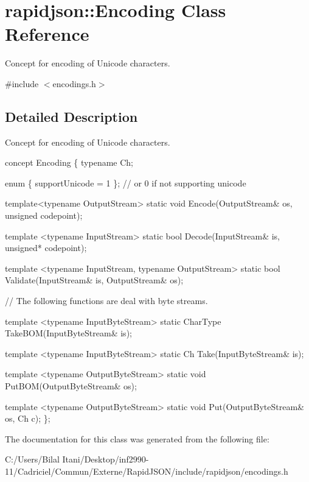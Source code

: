 \hypertarget{classrapidjson_1_1_encoding}{}\section{rapidjson\+:\+:Encoding Class Reference}
\label{classrapidjson_1_1_encoding}


Concept for encoding of Unicode characters.  




{\ttfamily \#include $<$encodings.\+h$>$}



\subsection{Detailed Description}
Concept for encoding of Unicode characters. 


\begin{DoxyCode}
concept Encoding \{
    \textcolor{keyword}{typename} Ch;    

    \textcolor{keyword}{enum} \{ supportUnicode = 1 \}; \textcolor{comment}{// or 0 if not supporting unicode}

    \textcolor{keyword}{template}<\textcolor{keyword}{typename} OutputStream>
    \textcolor{keyword}{static} \textcolor{keywordtype}{void} Encode(OutputStream& os, \textcolor{keywordtype}{unsigned} codepoint);

    \textcolor{keyword}{template} <\textcolor{keyword}{typename} InputStream>
    \textcolor{keyword}{static} \textcolor{keywordtype}{bool} Decode(InputStream& is, \textcolor{keywordtype}{unsigned}* codepoint);

    \textcolor{keyword}{template} <\textcolor{keyword}{typename} InputStream, \textcolor{keyword}{typename} OutputStream>
    \textcolor{keyword}{static} \textcolor{keywordtype}{bool} Validate(InputStream& is, OutputStream& os);

    \textcolor{comment}{// The following functions are deal with byte streams.}

    \textcolor{keyword}{template} <\textcolor{keyword}{typename} InputByteStream>
    \textcolor{keyword}{static} CharType TakeBOM(InputByteStream& is);

    \textcolor{keyword}{template} <\textcolor{keyword}{typename} InputByteStream>
    \textcolor{keyword}{static} Ch Take(InputByteStream& is);

    \textcolor{keyword}{template} <\textcolor{keyword}{typename} OutputByteStream>
    \textcolor{keyword}{static} \textcolor{keywordtype}{void} PutBOM(OutputByteStream& os);

    \textcolor{keyword}{template} <\textcolor{keyword}{typename} OutputByteStream>
    \textcolor{keyword}{static} \textcolor{keywordtype}{void} Put(OutputByteStream& os, Ch c);
\};
\end{DoxyCode}
 

The documentation for this class was generated from the following file\+:\begin{DoxyCompactItemize}
\item 
C\+:/\+Users/\+Bilal Itani/\+Desktop/inf2990-\/11/\+Cadriciel/\+Commun/\+Externe/\+Rapid\+J\+S\+O\+N/include/rapidjson/encodings.\+h\end{DoxyCompactItemize}
